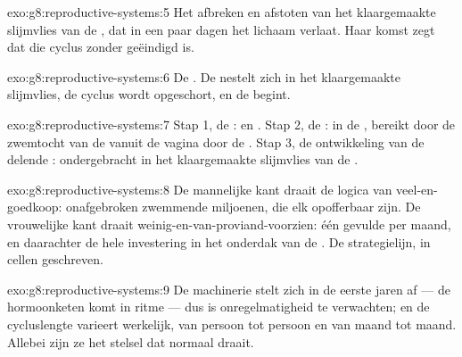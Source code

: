 \begin{solution}{exo:g8:reproductive-systems:5}
Het afbreken en afstoten van het klaargemaakte slijmvlies van de
, dat in een paar dagen het lichaam verlaat. Haar komst zegt dat
die cyclus zonder  geëindigd is.
\end{solution}

\begin{solution}{exo:g8:reproductive-systems:6}
De . De  nestelt zich in het klaargemaakte slijmvlies, de
cyclus wordt opgeschort, en de  begint.
\end{solution}

\begin{solution}{exo:g8:reproductive-systems:7}
Stap 1, de :  en . Stap 2, de : in
de , bereikt door de zwemtocht van de  vanuit de vagina
door de . Stap 3, de ontwikkeling van de delende :
ondergebracht in het klaargemaakte slijmvlies van de .
\end{solution}

\begin{solution}{exo:g8:reproductive-systems:8}
De mannelijke kant draait de logica van veel-en-goedkoop: onafgebroken
zwemmende miljoenen, die elk opofferbaar zijn. De vrouwelijke kant draait
weinig-en-van-proviand-voorzien: één gevulde  per maand, en daarachter
de hele investering in het onderdak van de . De strategielijn,
in cellen geschreven.
\end{solution}

\begin{solution}{exo:g8:reproductive-systems:9}
De machinerie stelt zich in de eerste jaren af --- de hormoonketen komt in
ritme --- dus is onregelmatigheid te verwachten; en de cycluslengte
varieert werkelijk, van persoon tot persoon en van maand tot maand.
Allebei zijn ze het stelsel dat normaal draait.
\end{solution}

